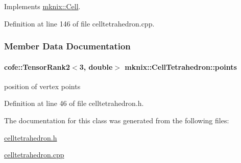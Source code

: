 Implements \hyperlink{classmknix_1_1_cell_a345a938d058d10f60d6c302a715290de}{mknix\+::\+Cell}.



Definition at line 146 of file celltetrahedron.\+cpp.



\subsubsection{Member Data Documentation}
\hypertarget{classmknix_1_1_cell_tetrahedron_ad43ea7159ab2b6818636340c6f76de65}{}
\paragraph[{points}]{\setlength{\rightskip}{0pt plus 5cm}cofe\+::\+Tensor\+Rank2$<$3, double$>$ mknix\+::\+Cell\+Tetrahedron\+::points\hspace{0.3cm}{\ttfamily [protected]}}\label{classmknix_1_1_cell_tetrahedron_ad43ea7159ab2b6818636340c6f76de65}
position of vertex points 

Definition at line 46 of file celltetrahedron.\+h.



The documentation for this class was generated from the following files\+:\begin{DoxyCompactItemize}
\item 
\hyperlink{celltetrahedron_8h}{celltetrahedron.\+h}\item 
\hyperlink{celltetrahedron_8cpp}{celltetrahedron.\+cpp}\end{DoxyCompactItemize}
